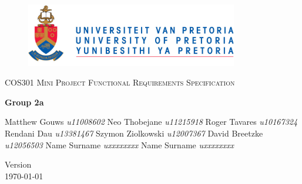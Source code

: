 \begin{titlepage}
	\begin{center}
		
		\begin{figure}[t]
			\centering
			\includegraphics[width=350px]{UP_Logo.png}
		\end{figure}
		
		\textsc{\LARGE COS301 Mini Project Functional \newline\newline Requirements Specification}
		
		\textbf{\newline Group 2a} \\
		\begin{flushright} \large
			Matthew Gouws \emph{u11008602} \newline
			Neo Thobejane \emph{u11215918} \newline
			Roger Tavares \emph{u10167324} \newline
			Rendani Dau \emph{u13381467} \newline
			Szymon Ziolkowski \emph{u12007367} \newline
			David Breetzke  \emph{u12056503} \newline
			Name Surname \emph{uxxxxxxxx} \newline
			Name Surname \emph{uxxxxxxxx} \newline
		\end{flushright}
		
		\vfill
		
		{\large Version }
		\\
		{\large \today}
		
	\end{center}
\end{titlepage}
